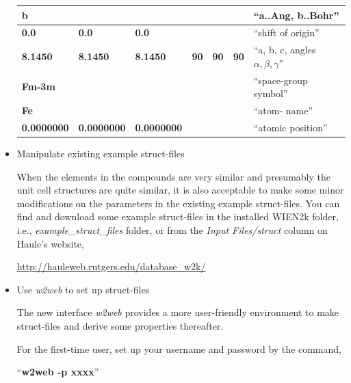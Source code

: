 \documentclass[12 pt]{article}
\begin{document}
\begin{itemize}[leftmargin=0.2in]
\begin{table}[ht]
  \begin{tabular}{|l|l|l|l|l|l|l|}

  \hline
  \textbf{b}		&			&			&	&	& 		& ``a..Ang, 
b..Bohr''\\ \hline

  \textbf{0.0} 		& \textbf{0.0} 		& \textbf{0.0}		&	&	& 		& ``shift of 
origin''\\ \hline

  \textbf{8.1450} 	& \textbf{8.1450} 	& \textbf{8.1450} 	& \textbf{90} 	& \textbf{90} 	& \textbf{90}
	& ``a, b, c, angles $\alpha, \beta, \gamma$''\\ \hline

  \textbf{Fm-3m}	&			&			&	&	&		& 
``space-group symbol''\\ \hline

  \textbf{Fe}		&			&			&	&	&		& ``atom-
name''\\ \hline

  \textbf{0.0000000} 	& \textbf{0.0000000} 	& \textbf{0.0000000}	&	&	&		& ``atomic
 position''\\ \hline

  \end{tabular}

  \end{table}

  \cleardoublepage

    \item Manipulate existing example struct-files

  When the elements in the compounds are very similar and presumably the unit cell structures are quite similar, it 
is also acceptable to make some minor modifications on the parameters in the existing example struct-files. You can 
find and download some example struct-files in the installed WIEN2k folder, i.e., \emph{example\_struct\_files} 
folder, or from the \emph{Input Files/struct} column on Haule's website, 

  \url{http://hauleweb.rutgers.edu/database\_w2k/}

  \cleardoublepage

    \item Use \emph{w2web} to set up struct-files

  The new interface \emph{w2web} provides a more user-friendly environment to make struct-files and derive some 
properties thereafter. 

  For the first-time user, set up your username and password by the command,  

  ``\textbf{w2web -p xxxx}''


\end{itemize}
\end{document}
